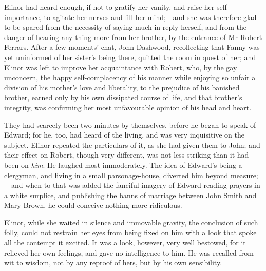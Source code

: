 Elinor had heard enough, if not to gratify her vanity, and raise her self-importance, to agitate her nerves and fill her mind;—and she was therefore glad to be spared from the necessity of saying much in reply herself, and from the danger of hearing any thing more from her brother, by the entrance of Mr Robert Ferrars. After a few moments' chat, John Dashwood, recollecting that Fanny was yet uninformed of her sister's being there, quitted the room in quest of her; and Elinor was left to improve her acquaintance with Robert, who, by the gay unconcern, the happy self-complacency of his manner while enjoying so unfair a division of his mother's love and liberality, to the prejudice of his banished brother, earned only by his own dissipated course of life, and that brother's integrity, was confirming her most unfavourable opinion of his head and heart.

They had scarcely been two minutes by themselves, before he began to speak of Edward; for he, too, had heard of the living, and was very inquisitive on the subject. Elinor repeated the particulars of it, as she had given them to John; and their effect on Robert, though very different, was not less striking than it had been on \textit{him}. He laughed most immoderately. The idea of Edward's being a clergyman, and living in a small parsonage-house, diverted him beyond measure;—and when to that was added the fanciful imagery of Edward reading prayers in a white surplice, and publishing the banns of marriage between John Smith and Mary Brown, he could conceive nothing more ridiculous.

Elinor, while she waited in silence and immovable gravity, the conclusion of such folly, could not restrain her eyes from being fixed on him with a look that spoke all the contempt it excited. It was a look, however, very well bestowed, for it relieved her own feelings, and gave no intelligence to him. He was recalled from wit to wisdom, not by any reproof of hers, but by his own sensibility.


